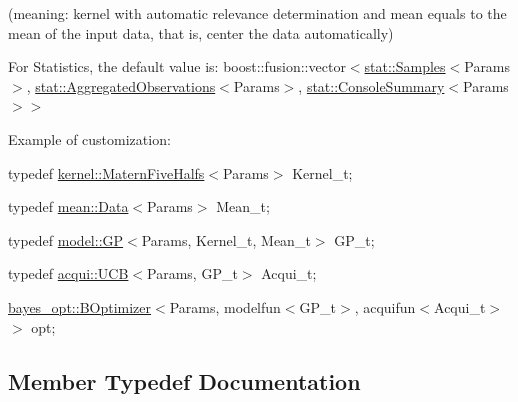(meaning\+: kernel with automatic relevance determination and mean equals to the mean of the input data, that is, center the data automatically)

For Statistics, the default value is\+: {\ttfamily boost\+::fusion\+::vector$<$\hyperlink{structlimbo_1_1stat_1_1_samples}{stat\+::\+Samples}$<$Params$>$, \hyperlink{structlimbo_1_1stat_1_1_aggregated_observations}{stat\+::\+Aggregated\+Observations}$<$Params$>$, \hyperlink{structlimbo_1_1stat_1_1_console_summary}{stat\+::\+Console\+Summary}$<$Params$>$$>$}

Example of customization\+:
\begin{DoxyItemize}
\item {\ttfamily typedef \hyperlink{structlimbo_1_1kernel_1_1_matern_five_halfs}{kernel\+::\+Matern\+Five\+Halfs}$<$Params$>$ Kernel\+\_\+t;}
\item {\ttfamily typedef \hyperlink{structlimbo_1_1mean_1_1_data}{mean\+::\+Data}$<$Params$>$ Mean\+\_\+t;}
\item {\ttfamily typedef \hyperlink{classlimbo_1_1model_1_1_g_p}{model\+::\+G\+P}$<$Params, Kernel\+\_\+t, Mean\+\_\+t$>$ G\+P\+\_\+t;}
\item {\ttfamily typedef \hyperlink{classlimbo_1_1acqui_1_1_u_c_b}{acqui\+::\+U\+C\+B}$<$Params, G\+P\+\_\+t$>$ Acqui\+\_\+t;}
\item {\ttfamily \hyperlink{classlimbo_1_1bayes__opt_1_1_b_optimizer}{bayes\+\_\+opt\+::\+B\+Optimizer}$<$Params, modelfun$<$G\+P\+\_\+t$>$, acquifun$<$Acqui\+\_\+t$>$$>$ opt;} 
\end{DoxyItemize}

\subsection{Member Typedef Documentation}
\hypertarget{classlimbo_1_1bayes__opt_1_1_bo_base_a200a43abb6c95d2d99660898b36f2200}{}
